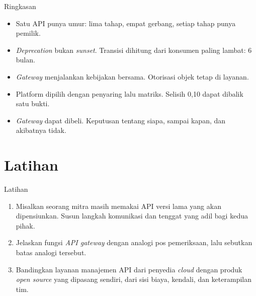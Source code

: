 \documentclass[aspectratio=169, table, 12pt]{beamer}
\begin{document}
\begin{frame}{{\Large Ringkasan}}
  \vspace{8pt}
  \begin{itemize}
    \item Satu API punya umur: lima tahap, empat gerbang, setiap tahap punya pemilik.
    \item \textit{Deprecation} bukan \textit{sunset}. Transisi dihitung dari konsumen paling lambat: 6 bulan.
    \item \textit{Gateway} menjalankan kebijakan bersama. Otorisasi objek tetap di layanan.
    \item Platform dipilih dengan penyaring lalu matriks. Selisih 0,10 dapat dibalik satu bukti.
    \item \textit{Gateway} dapat dibeli. Keputusan tentang siapa, sampai kapan, dan akibatnya tidak.
  \end{itemize}
\end{frame}

\section{Latihan}

\begin{frame}{{\Large Latihan}}
  \vspace{8pt}
  \begin{enumerate}
    \item Misalkan seorang mitra masih memakai API versi lama yang akan dipensiunkan. Susun langkah komunikasi dan tenggat yang adil bagi kedua pihak.
    \item Jelaskan fungsi \textit{API gateway} dengan analogi pos pemeriksaan, lalu sebutkan batas analogi tersebut.
    \item Bandingkan layanan manajemen API dari penyedia \textit{cloud} dengan produk \textit{open source} yang dipasang sendiri, dari sisi biaya, kendali, dan keterampilan tim.
  \end{enumerate}
\end{frame}
\end{document}
